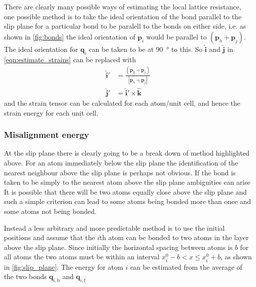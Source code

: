 There are clearly many possible ways of estimating the local lattice resistance, one possible method is to take the ideal orientation of the bond parallel to the slip plane for a particular bond to be paralell to the bonds on either side, i.e. as shown in \autoref{fig:bonds} the ideal orientation of $\mathbf{p}_i$ would be  parallel to $(\mathbf{p}_h + \mathbf{p}_j)$. The ideal orientation for $\mathbf{q}_i$ can be taken to be at \SI{90}{\degree} to this. So $\mathbf{\hat{i}}$ and $\mathbf{\hat{j}}$ in \autoref{eqn:estimate_strains} can be replaced with 
\begin{align}
\mathbf{\hat{i}}' &= \frac{(\mathbf{p}_h + \mathbf{p}_j)}{|\mathbf{p}_h + \mathbf{p}_j|} \nonumber \\
\mathbf{\hat{j}}' &= {\mathbf{\hat{i}}' \times \mathbf{\hat{k}}}
\end{align}
and the strain tensor can be calculated for each atom/unit cell, and hence the strain energy for each unit cell.



\FloatBarrier
\subsubsection{Misalignment energy}
\FloatBarrier
At the slip plane there is clearly going to be a break down of method highlighted above. For an atom immediately below the slip plane the identification of the nearest neighbour above the slip plane is perhaps not obvious. If the bond is taken to be simply  to the nearest atom above the slip plane ambiguities can arise 
It is possible that there will be two atoms equally close above the slip plane and such a simple criterion can lead to some atoms being bonded more than once and some atoms not being bonded. 

Instead a less arbitrary and more predictable method is to use the initial positions and assume that the $i$th atom can be bonded to two atoms in the layer above the slip plane. Since initially the horizontal spacing between atoms is $b$ for all atoms the two atoms must be within an interval $x_i^0 - b < x \leq x_i^0 + b$, as shown in \autoref{fig:slip_plane}. The energy for atom $i$ can be estimated from the average of the two bonds $\mathbf{q}_{i,\text{b}}$ and $\mathbf{q}_{i,\text{f}}$

